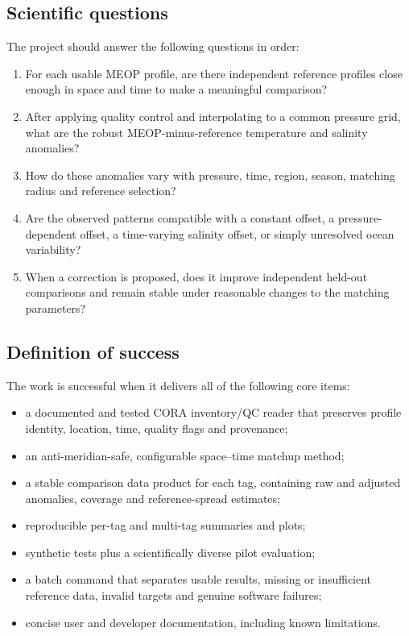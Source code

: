 \documentclass[11pt,a4paper]{article}
\begin{document}
\subsection{Scientific questions}

The project should answer the following questions in order:

\begin{enumerate}[leftmargin=1.6em]
  \item For each usable MEOP profile, are there independent reference profiles close
  enough in space and time to make a meaningful comparison?
  \item After applying quality control and interpolating to a common pressure grid,
  what are the robust MEOP-minus-reference temperature and salinity anomalies?
  \item How do these anomalies vary with pressure, time, region, season, matching
  radius and reference selection?
  \item Are the observed patterns compatible with a constant offset, a pressure-dependent
  offset, a time-varying salinity offset, or simply unresolved ocean variability?
  \item When a correction is proposed, does it improve independent held-out comparisons
  and remain stable under reasonable changes to the matching parameters?
\end{enumerate}

\subsection{Definition of success}

The work is successful when it delivers all of the following core items:

\begin{itemize}[leftmargin=1.5em]
  \item a documented and tested CORA inventory/QC reader that preserves profile identity,
  location, time, quality flags and provenance;
  \item an anti-meridian-safe, configurable space--time matchup method;
  \item a stable comparison data product for each tag, containing raw and adjusted
  anomalies, coverage and reference-spread estimates;
  \item reproducible per-tag and multi-tag summaries and plots;
  \item synthetic tests plus a scientifically diverse pilot evaluation;
  \item a batch command that separates usable results, missing or insufficient
  reference data, invalid targets and genuine software failures;
  \item concise user and developer documentation, including known limitations.
\end{itemize}
\end{document}
